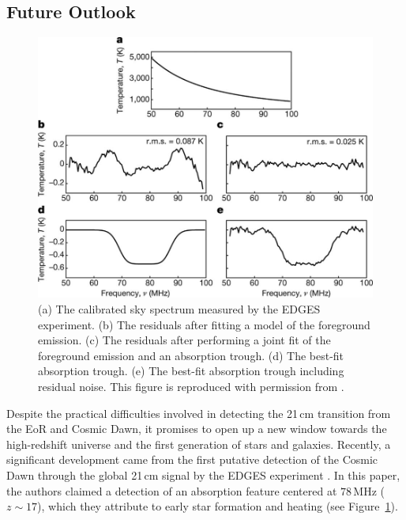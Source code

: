 \begin{bibunit}
\section{Future Outlook}\label{sec:intro-future-outlook}

\begin{figure}[t]
    \centering
    \includegraphics[width=\textwidth]{figures/chapter1/bowman-2018-absorption-trough}
    \caption{
        (a) The calibrated sky spectrum measured by the EDGES experiment.
        (b) The residuals after fitting a model of the foreground emission.
        (c) The residuals after performing a joint fit of the foreground emission and an absorption
        trough.
        (d) The best-fit absorption trough.
        (e) The best-fit absorption trough including residual noise.
        This figure is reproduced with permission from \citet{2018Natur.555...67B}.
    }
    \label{fig:bowman-absorption-trough}
\end{figure}

Despite the practical difficulties involved in detecting the 21\,cm transition from the EoR and
Cosmic Dawn, it promises to open up a new window towards the high-redshift universe and the first
generation of stars and galaxies.  Recently, a significant development came from the first putative
detection of the Cosmic Dawn through the global 21\,cm signal by the EDGES experiment
\citep{2018Natur.555...67B}. In this paper, the authors claimed a detection of an absorption feature
centered at $78\,\text{MHz}$ ($z\sim17$), which they attribute to early star formation and heating
(see Figure~\ref{fig:bowman-absorption-trough}).


\end{bibunit}
